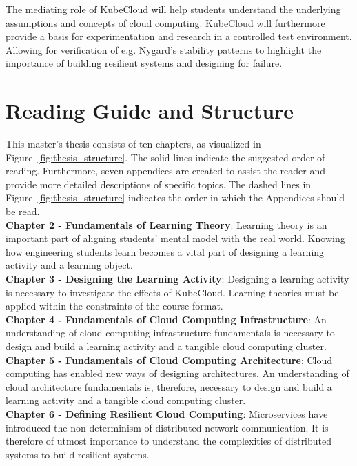 \noindent
The mediating role of KubeCloud will help students understand the underlying assumptions and concepts of cloud computing. KubeCloud will furthermore provide a basis for experimentation and research in a controlled test environment. Allowing for verification of e.g. Nygard's stability patterns to highlight the importance of building resilient systems and designing for failure.

\section{Reading Guide and Structure}
This master's thesis consists of ten chapters, as visualized in Figure~\ref{fig:thesis_structure}. The solid lines indicate the suggested order of reading. Furthermore, seven appendices are created to assist the reader and provide more detailed descriptions of specific topics. The dashed lines in Figure~\ref{fig:thesis_structure} indicates the order in which the Appendices should be read. \\

\noindent\textbf{Chapter 2 - Fundamentals of Learning Theory}: Learning theory is an important part of aligning students' mental model with the real world. Knowing how engineering students learn becomes a vital part of designing a learning activity and a learning object. \\

\noindent\textbf{Chapter 3 - Designing the Learning Activity}: Designing a learning activity is necessary to investigate the effects of KubeCloud. Learning theories must be applied within the constraints of the course format.\\

\noindent\textbf{Chapter 4 - Fundamentals of Cloud Computing Infrastructure}: An understanding of cloud computing infrastructure fundamentals is necessary to design and build a learning activity and a tangible cloud computing cluster. \\

\noindent\textbf{Chapter 5 - Fundamentals of Cloud Computing Architecture}: Cloud computing has enabled new ways of designing architectures. An understanding of cloud architecture fundamentals is, therefore, necessary to design and build a learning activity and a tangible cloud computing cluster. \\

\noindent\textbf{Chapter 6 - Defining Resilient Cloud Computing}: Microservices have introduced the non-determinism of distributed network communication. It is therefore of utmost importance to understand the complexities of distributed systems to build resilient systems. \\

